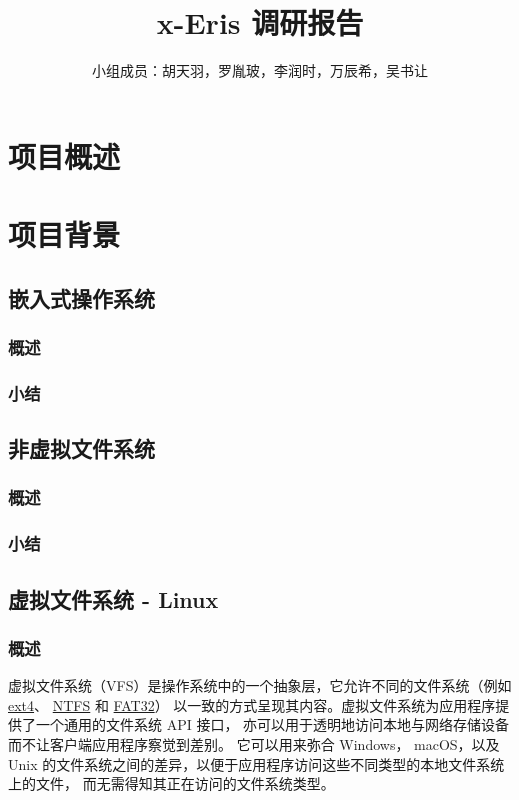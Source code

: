 \documentclass[UTF8,a4paper]{ctexart}
\title{\textbf{x-Eris 调研报告}}
\author{小组成员：胡天羽，罗胤玻，李润时，万辰希，吴书让}
\begin{document}
\maketitle

\section{项目概述}
\section{项目背景}
\subsection{嵌入式操作系统}
\subsubsection{概述}
\subsubsection{小结}

\subsection{非虚拟文件系统}
\subsubsection{概述}
\subsubsection{小结}

\subsection{虚拟文件系统 - Linux}
\subsubsection{概述}

虚拟文件系统（VFS）是操作系统中的一个抽象层，它允许不同的文件系统（例如
\href{https://en.wikipedia.org/wiki/Ext4}{ext4}、
\href{https://en.wikipedia.org/wiki/NTFS}{NTFS}
和
\href{https://en.wikipedia.org/wiki/File_Allocation_Table}{FAT32}）
以一致的方式呈现其内容。虚拟文件系统为应用程序提供了一个通用的文件系统
API
接口，
亦可以用于透明地访问本地与网络存储设备而不让客户端应用程序察觉到差别。
它可以用来弥合
Windows， macOS，以及 Unix
的文件系统之间的差异，以便于应用程序访问这些不同类型的本地文件系统上的文件，
而无需得知其正在访问的文件系统类型。
\end{document}
